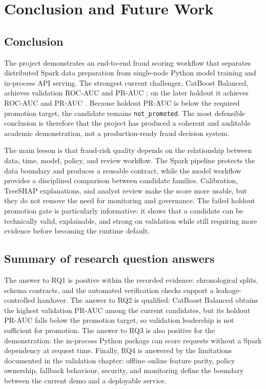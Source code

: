 \chapter{Conclusion and Future Work}
\label{chap:conclusion}

\section{Conclusion}

The project demonstrates an end-to-end fraud scoring workflow that separates distributed Spark data preparation from single-node Python model training and in-process API serving. The strongest current challenger, CatBoost Balanced, achieves validation ROC-AUC  and PR-AUC ; on the later holdout it achieves ROC-AUC  and PR-AUC . Because holdout PR-AUC is below the required promotion target, the candidate remains \texttt{not\_promoted}. The most defensible conclusion is therefore that the project has produced a coherent and auditable academic demonstration, not a production-ready fraud decision system.

The main lesson is that fraud-risk quality depends on the relationship between
data, time, model, policy, and review workflow. The Spark pipeline protects the
data boundary and produces a reusable contract, while the model workflow
provides a disciplined comparison between candidate families. Calibration,
TreeSHAP explanations, and analyst review make the score more usable, but they
do not remove the need for monitoring and governance. The failed holdout
promotion gate is particularly informative: it shows that a candidate can be
technically valid, explainable, and strong on validation while still requiring
more evidence before becoming the runtime default.

\section{Summary of research question answers}

The answer to RQ1 is positive within the recorded evidence: chronological splits, schema contracts, and the automated verification checks support a leakage-controlled handover. The answer to RQ2 is qualified: CatBoost Balanced obtains the highest validation PR-AUC among the current candidates, but its holdout PR-AUC falls below the promotion target, so validation leadership is not sufficient for promotion. The answer to RQ3 is also positive for the demonstration: the in-process Python package can score requests without a Spark dependency at request time. Finally, RQ4 is answered by the limitations documented in the validation chapter: offline--online feature parity, policy ownership, fallback behaviour, security, and monitoring define the boundary between the current demo and a deployable service.

